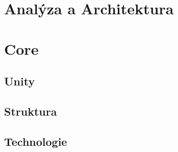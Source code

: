 \chapter{Analýza a Architektura}

\chapter{Core}
\section{Unity}
\section{Struktura}
\section{Technologie}

